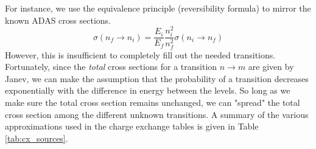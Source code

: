 For instance, we use the equivalence principle (reversibility formula) to mirror the known ADAS cross sections.
\begin{equation}\label{eq:equilvalence}
    \sigma(n_f \rightarrow n_i) = \frac{E_i}{E_f}\frac{n_i^2}{n_f^2}\sigma(n_i \rightarrow n_f)
\end{equation}
However, this is insufficient to completely fill out the needed transitions.
Fortunately, since the \textit{total} cross sections for a transition $n \rightarrow m$ are given by Janev\cite{janev2003collision}, we can make the assumption that the probability of a transition decreases exponentially with the difference in energy between the levels. So long as we make sure the total cross section remains unchanged, we can "spread" the total cross section among the different unknown transitions.
A summary of the various approximations used in the charge exchange tables is given in Table \ref{tab:cx_sources}.
